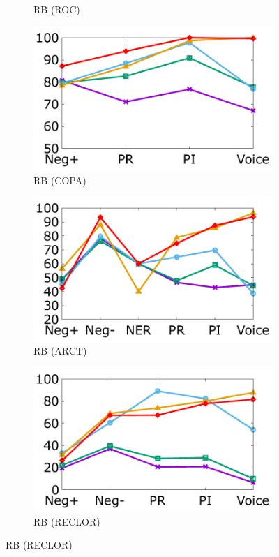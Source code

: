 \begin{figure}[th]
\begin{subfigure}[b]{0.162\textwidth}
\caption{RB (ROC)}
\label{fig:roc_roberta}
\end{subfigure}
\hfill
\begin{subfigure}[b]{0.162\textwidth}
\centering
\includegraphics[width=\columnwidth]{data/copa_roberta.pdf}
\caption{RB (COPA)}
\label{fig:copa_roberta}
\end{subfigure}
\hfill
\begin{subfigure}[b]{0.162\textwidth}
\centering
\includegraphics[width=\columnwidth]{data/arct_roberta.pdf}
\caption{RB (ARCT)}
\label{fig:arct_roberta}
\end{subfigure}
\hfill
\begin{subfigure}[b]{0.162\textwidth}
\centering
\includegraphics[width=\columnwidth]{data/reclor_roberta.pdf}
\caption{RB (RECLOR)}
\label{fig:arct_roberta}
\end{subfigure}


\end{figure}

